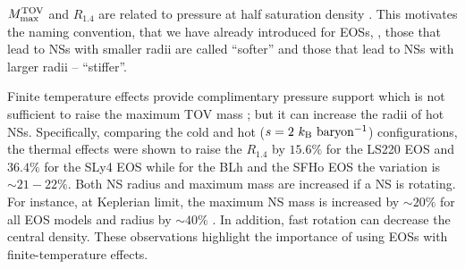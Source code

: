 $M_\text{max}^\text{TOV}$ and $R_{1.4}$ are related to pressure at half saturation density \citep{Lattimer:2012nd}.
This motivates the naming convention, that we have already introduced 
for \acp{EOS}, \ie, those that lead to \acp{NS} with smaller 
radii are called ``softer'' and those that lead to \acp{NS} with larger radii 
-- ``stiffer''. 

Finite temperature effects provide complimentary pressure support 
which is not sufficient to raise the maximum \ac{TOV} mass 
\citep{Kaplan:2013wra}; but it can increase the radii of hot \acp{NS}.
Specifically, comparing the cold and hot ($s=2~{k_{\rm B}~{\rm baryon^{-1}}}$)
configurations, the thermal effects were shown to raise the $R_{1.4}$
by $15.6 \%$ for the LS220 \ac{EOS} and $36.4 \%$ for the SLy4 EOS 
while for the BLh and the SFHo \ac{EOS} the variation is $\sim 21-22 \%$.
%
Both \ac{NS} radius and maximum mass are increased if a \ac{NS} is rotating. 
For instance, at Keplerian limit, the maximum \ac{NS} mass is increased by 
$\sim 20\%$ for all \ac{EOS} models and radius by $\sim 40\%$ \citep{Bernuzzi:2020txg}. 
In addition, fast rotation can decrease the central density.
%
These observations highlight the importance of using \acp{EOS} with 
finite-temperature effects. 




